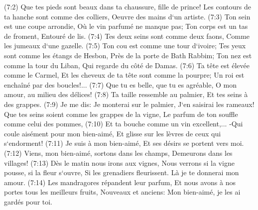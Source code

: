 \verse (7:2) Que tes pieds sont beaux dans ta chaussure, fille de prince! Les contours de ta hanche sont comme des colliers, Oeuvre des mains d`un artiste. 
\verse (7:3) Ton sein est une coupe arrondie, Où le vin parfumé ne manque pas; Ton corps est un tas de froment, Entouré de lis. 
\verse (7:4) Tes deux seins sont comme deux faons, Comme les jumeaux d`une gazelle. 
\verse (7:5) Ton cou est comme une tour d`ivoire; Tes yeux sont comme les étangs de Hesbon, Près de la porte de Bath Rabbim; Ton nez est comme la tour du Liban, Qui regarde du côté de Damas. 
\verse (7:6) Ta tête est élevée comme le Carmel, Et les cheveux de ta tête sont comme la pourpre; Un roi est enchaîné par des boucles!... 
\verse (7:7) Que tu es belle, que tu es agréable, O mon amour, au milieu des délices! 
\verse (7:8) Ta taille ressemble au palmier, Et tes seins à des grappes. 
\verse (7:9) Je me dis: Je monterai sur le palmier, J`en saisirai les rameaux! Que tes seins soient comme les grappes de la vigne, Le parfum de ton souffle comme celui des pommes, 
\verse (7:10) Et ta bouche comme un vin excellent,... -Qui coule aisément pour mon bien-aimé, Et glisse sur les lèvres de ceux qui s`endorment! 
\verse (7:11) Je suis à mon bien-aimé, Et ses désirs se portent vers moi. 
\verse (7:12) Viens, mon bien-aimé, sortons dans les champs, Demeurons dans les villages! 
\verse (7:13) Dès le matin nous irons aux vignes, Nous verrons si la vigne pousse, si la fleur s`ouvre, Si les grenadiers fleurissent. Là je te donnerai mon amour. 
\verse (7:14) Les mandragores répandent leur parfum, Et nous avons à nos portes tous les meilleurs fruits, Nouveaux et anciens: Mon bien-aimé, je les ai gardés pour toi. 

\chapter{}

